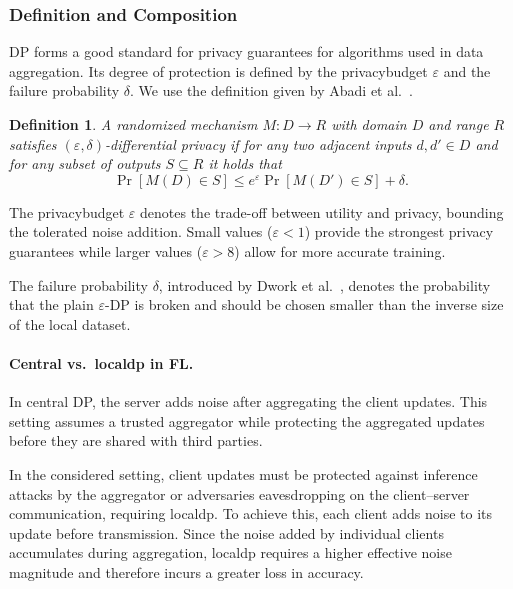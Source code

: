 \documentclass[11pt,twocolumn,a4paper,DIV=calc,parskip=half]{scrartcl}
\newtheorem{definition}{Definition}
\begin{document}
	\subsubsection{Definition and Composition}

	\ac{DP} forms a good standard for privacy guarantees for algorithms used in data aggregation. Its degree of protection is defined by the \gls{privacybudget} $\varepsilon$ and the failure probability $\delta$. We use the definition given by Abadi et al.~\cite{abadi2016deep}.
	
\begin{definition}
	A randomized mechanism $M\colon D\rightarrow R$ with domain $D$ and range $R$ 
	satisfies $(\varepsilon,\delta)$-differential privacy if for any two adjacent inputs $d,d'\in D$ and for any subset of outputs $S\subseteq R$ it holds that
	\[
	\Pr[M(D)\in S]\leq e^{\varepsilon}\Pr[M(D')\in S]+\delta.
	\]
\end{definition}

	The \gls{privacybudget} $\varepsilon$ denotes the trade-off between utility and privacy, bounding the tolerated noise addition. Small values ($\varepsilon < 1$) provide the strongest privacy guarantees while larger values ($\varepsilon >8$) allow for more accurate training.
	
	The failure probability $\delta$, introduced by Dwork et al.~\cite{privacy_delta}, denotes the probability that the plain $\varepsilon$-\ac{DP} is broken and should be chosen smaller than the inverse size of the local dataset.
	
	\paragraph{Central vs.\ \Gls{localdp} in FL.}
	
	In central DP, the server adds noise after aggregating the client updates. This setting assumes a trusted aggregator while protecting the aggregated updates before they are shared with third parties.
	
	In the considered setting, client updates must be protected against inference attacks by the aggregator or adversaries eavesdropping on the client--server communication, requiring \gls{localdp}. To achieve this, each client adds noise to its update before transmission. Since the noise added by individual clients accumulates during aggregation, \gls{localdp} requires a higher effective noise magnitude and therefore incurs a greater loss in accuracy.
	
\end{document}

